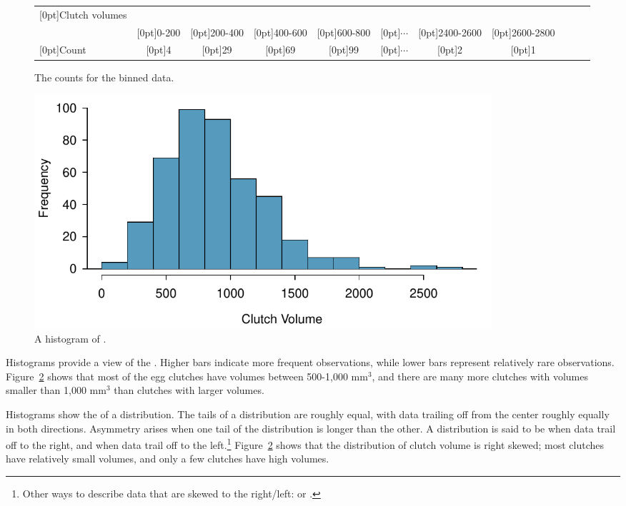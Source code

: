 \begin{figure}[ht]
	\centering\small
	\begin{tabular}{l ccc ccc ccc c}
		\hline
		\raisebox{-1.5ex}[0pt]{Clutch volumes} & \\
		& \raisebox{1.5ex}[0pt]{0-200} & \raisebox{1.5ex}[0pt]{200-400} & \raisebox{1.5ex}[0pt]{400-600} & \raisebox{1.5ex}[0pt]{600-800} & \raisebox{1.5ex}[0pt]{$\cdots$} & \raisebox{1.5ex}[0pt]{2400-2600} & \raisebox{1.5ex}[0pt]{2600-2800} \\
		\hline
		\raisebox{-.25ex}[0pt]{Count} & \raisebox{-.25ex}[0pt]{4} & \raisebox{-.25ex}[0pt]{29} & \raisebox{-.25ex}[0pt]{69} & \raisebox{-.25ex}[0pt]{99} & \raisebox{-.25ex}[0pt]{$\cdots$} & \raisebox{-.25ex}[0pt]{2} & \raisebox{-.25ex}[0pt]{1} \\
		\hline
	\end{tabular}
	\caption{The counts for the binned  data.}
	\label{frogBinnedClutchVolTable}
\end{figure}

\begin{figure}[ht]
	\centering
	\includegraphics[width=0.82\textwidth]{ch_01a_intro_to_data_oi_biostat/figures/frogHist/frogHist}
	\caption{A histogram of .}
	\label{frogHist}
\end{figure}

Histograms provide a view of the . Higher bars indicate more frequent observations, while lower bars represent relatively rare observations. Figure~\ref{frogHist} shows that most of the egg clutches have volumes between 500-1,000 mm$^3$, and there are many more clutches with volumes smaller than 1,000 mm$^{3}$ than clutches with larger volumes. 

Histograms show the  of a distribution\label{shapeFirstDiscussed}. The tails of a  distribution are roughly equal, with data trailing off from the center roughly equally in both directions. Asymmetry arises when one tail of the distribution is longer than the other. A distribution is said to be  when data trail off to the right, and  when data trail off to the left.\footnote{Other ways to describe data that are skewed to the right/left:  or .} Figure~\ref{frogHist} shows that the distribution of clutch volume is right skewed; most clutches have relatively small volumes, and only a few clutches have high volumes. 

